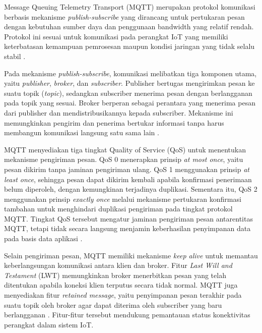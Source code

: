Message Queuing Telemetry Transport (MQTT) merupakan protokol komunikasi berbasis mekanisme \textit{publish-subscribe} yang dirancang untuk pertukaran pesan dengan kebutuhan sumber daya dan penggunaan bandwidth yang relatif rendah. Protokol ini sesuai untuk komunikasi pada perangkat IoT yang memiliki keterbatasan kemampuan pemrosesan maupun kondisi jaringan yang tidak selalu stabil \cite{oasis_mqtt}.

Pada mekanisme \textit{publish-subscribe}, komunikasi melibatkan tiga komponen utama, yaitu \textit{publisher}, \textit{broker}, dan \textit{subscriber}. Publisher bertugas mengirimkan pesan ke suatu topik (\textit{topic}), sedangkan subscriber menerima pesan dengan berlangganan pada topik yang sesuai. Broker berperan sebagai perantara yang menerima pesan dari publisher dan mendistribusikannya kepada subscriber. Mekanisme ini memungkinkan pengirim dan penerima bertukar informasi tanpa harus membangun komunikasi langsung satu sama lain \cite{oasis_mqtt}.

MQTT menyediakan tiga tingkat Quality of Service (QoS) untuk menentukan mekanisme pengiriman pesan. QoS 0 menerapkan prinsip \textit{at most once}, yaitu pesan dikirim tanpa jaminan pengiriman ulang. QoS 1 menggunakan prinsip \textit{at least once}, sehingga pesan dapat dikirim kembali apabila konfirmasi penerimaan belum diperoleh, dengan kemungkinan terjadinya duplikasi. Sementara itu, QoS 2 menggunakan prinsip \textit{exactly once} melalui mekanisme pertukaran konfirmasi tambahan untuk menghindari duplikasi pengiriman pada tingkat protokol MQTT. Tingkat QoS tersebut mengatur jaminan pengiriman pesan antarentitas MQTT, tetapi tidak secara langsung menjamin keberhasilan penyimpanan data pada basis data aplikasi \cite{oasis_mqtt}.

Selain pengiriman pesan, MQTT memiliki mekanisme \textit{keep alive} untuk memantau keberlangsungan komunikasi antara klien dan broker. Fitur \textit{Last Will and Testament} (LWT) memungkinkan broker menerbitkan pesan yang telah ditentukan apabila koneksi klien terputus secara tidak normal. MQTT juga menyediakan fitur \textit{retained message}, yaitu penyimpanan pesan terakhir pada suatu topik oleh broker agar dapat diterima oleh subscriber yang baru berlangganan \cite{mqtt_oasis}. Fitur-fitur tersebut mendukung pemantauan status konektivitas perangkat dalam sistem IoT.

